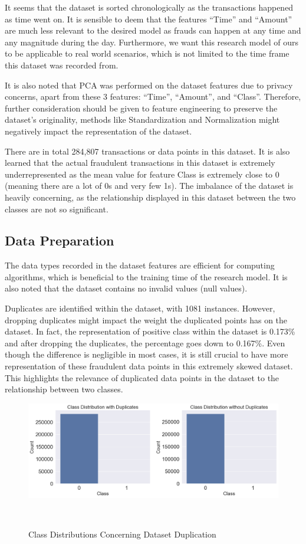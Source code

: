 \documentclass[12pt, letterpaper]{article}
\begin{document}
        It seems that the dataset is sorted chronologically as the transactions happened as time went on. It is sensible to deem that the features ``Time'' and ``Amount'' are much less relevant to the desired model as frauds can happen at any time and any magnitude during the day. Furthermore, we want this research model of ours to be applicable to real world scenarios, which is not limited to the time frame this dataset was recorded from.

        It is also noted that PCA was performed on the dataset features due to privacy concerns, apart from these 3 features: ``Time'', ``Amount'', and ``Class''. Therefore, further consideration should be given to feature engineering to preserve the dataset's originality, methods like Standardization and Normalization might negatively impact the representation of the dataset.

        There are in total 284,807 transactions or data points in this dataset. It is also learned that the actual fraudulent transactions in this dataset is extremely underrepresented as the mean value for feature Class is extremely close to 0 (meaning there are a lot of 0s and very few 1s). The imbalance of the dataset is heavily concerning, as the relationship displayed in this dataset between the two classes are not so significant.

    \subsection{Data Preparation}
        The data types recorded in the dataset features are efficient for computing algorithms, which is beneficial to the training time of the research model. It is also noted that the dataset contains no invalid values (null values).

        Duplicates are identified within the dataset, with 1081 instances. However, dropping duplicates might impact the weight the duplicated points has on the dataset. In fact, the representation of positive class within the dataset is 0.173\% and after dropping the duplicates, the percentage goes down to 0.167\%. Even though the difference is negligible in most cases, it is still crucial to have more representation of these fraudulent data points in this extremely skewed dataset. This highlights the relevance of duplicated data points in the dataset to the relationship between two classes.
        
        \begin{figure}[h]
            \centering
            \includegraphics[width=1\linewidth]{Figures/Class-representation.png}
            \caption{Class Distributions Concerning Dataset Duplication}~\label{fig:enter-label}
        \end{figure}
\end{document}
